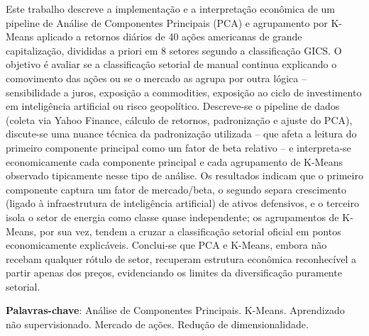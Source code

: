 \documentclass[12pt,oneside,a4paper,brazil,sumario=tradicional]{abntex2}
\begin{document}
\pretextual

\imprimircapa
\imprimirfolhaderosto

\begin{resumo}
Este trabalho descreve a implementação e a interpretação econômica de um pipeline
de Análise de Componentes Principais (PCA) e agrupamento por K-Means aplicado a
retornos diários de 40 ações americanas de grande capitalização, divididas a
priori em 8 setores segundo a classificação GICS. O objetivo é avaliar se a
classificação setorial de manual continua explicando o comovimento das ações ou
se o mercado as agrupa por outra lógica -- sensibilidade a juros, exposição a
commodities, exposição ao ciclo de investimento em inteligência artificial ou
risco geopolítico. Descreve-se o pipeline de dados (coleta via Yahoo Finance,
cálculo de retornos, padronização e ajuste do PCA), discute-se uma nuance técnica
da padronização utilizada -- que afeta a leitura do primeiro componente principal
como um fator de beta relativo -- e interpreta-se economicamente cada componente
principal e cada agrupamento de K-Means observado tipicamente nesse tipo de
análise. Os resultados indicam que o primeiro componente captura um fator de
mercado/beta, o segundo separa crescimento (ligado à infraestrutura de
inteligência artificial) de ativos defensivos, e o terceiro isola o setor de
energia como classe quase independente; os agrupamentos de K-Means, por sua vez,
tendem a cruzar a classificação setorial oficial em pontos economicamente
explicáveis. Conclui-se que PCA e K-Means, embora não recebam qualquer rótulo de
setor, recuperam estrutura econômica reconhecível a partir apenas dos preços,
evidenciando os limites da diversificação puramente setorial.

\vspace{\onelineskip}

\noindent
\textbf{Palavras-chave}: Análise de Componentes Principais. K-Means.
Aprendizado não supervisionado. Mercado de ações. Redução de dimensionalidade.
\end{resumo}

\tableofcontents*
\cleardoublepage

\textual
\end{document}
